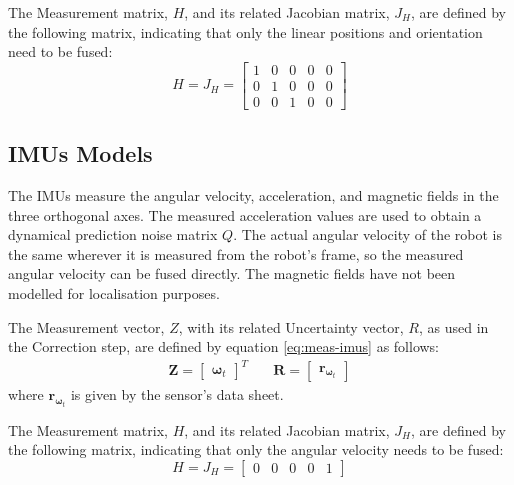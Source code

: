 The Measurement matrix, $H$, and its related Jacobian matrix, $J_H$, are defined by the following matrix, indicating that only the linear positions and orientation need to be fused:
\begin{equation}
H = J_H =
\begin{bmatrix}
1 & 0 & 0 & 0 & 0 \\
0 & 1 & 0 & 0 & 0 \\
0 & 0 & 1 & 0 & 0
\end{bmatrix}
\end{equation}

\subsection{IMUs Models}

\noindent The \glspl{IMU} measure the angular velocity, acceleration, and magnetic fields in the three orthogonal axes.
The measured acceleration values are used to obtain a dynamical prediction noise matrix $Q$.
The actual angular velocity of the robot is the same wherever it is measured from the robot's frame, so the measured angular velocity can be fused directly.
The magnetic fields have not been modelled for localisation purposes.

The Measurement vector, $Z$, with its related Uncertainty vector, $R$, as used in the Correction step, are defined by equation \eqref{eq:meas-imus} as follows:  
\begin{align}
\label{eq:meas-imus}
\mathbf{Z}
=
\begin{bmatrix}
\boldsymbol \omega_{t}
\end{bmatrix}^T
& \quad
\mathbf{R}
=
\begin{bmatrix}
\mathbf{r}_{\boldsymbol \omega_t}
\end{bmatrix}
\end{align}
where $\mathbf{r}_{\boldsymbol \omega_t}$ is given by the sensor's data sheet.

The Measurement matrix, $H$, and its related Jacobian matrix, $J_H$, are defined by the following matrix, indicating that only the angular velocity needs to be fused:
\begin{equation}
H = J_H =
\begin{bmatrix}
0 & 0 & 0 & 0 & 1
\end{bmatrix}
\end{equation}

